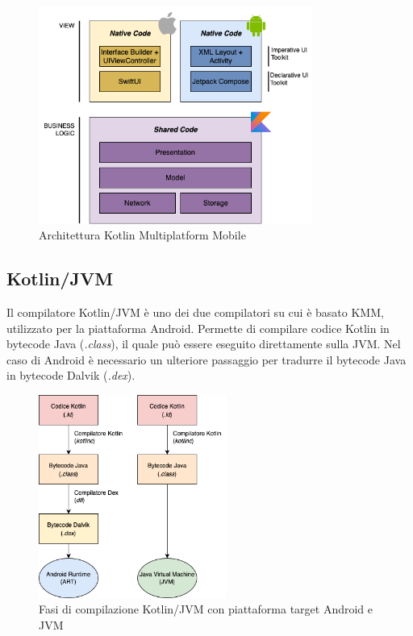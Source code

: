 \begin{figure}[H]
\centering
\includegraphics[width=0.8\textwidth]{img/tesi-8-kmm.drawio.png}
\caption{Architettura Kotlin Multiplatform Mobile}
\end{figure}

\subsection{Kotlin/JVM}
Il compilatore Kotlin/JVM è uno dei due compilatori su cui è basato KMM, utilizzato per la piattaforma Android. Permette di compilare codice Kotlin in bytecode Java (\textit{.class}), il quale può essere eseguito direttamente sulla JVM. Nel caso di Android è necessario un ulteriore passaggio per tradurre il bytecode Java in bytecode Dalvik (\textit{.dex}).

\begin{figure}[H]
\centering
\includegraphics[width=0.55\textwidth]{img/tesi-9-kotlinjvm.drawio.png}
\caption{Fasi di compilazione Kotlin/JVM con piattaforma target Android e JVM}
\end{figure}

